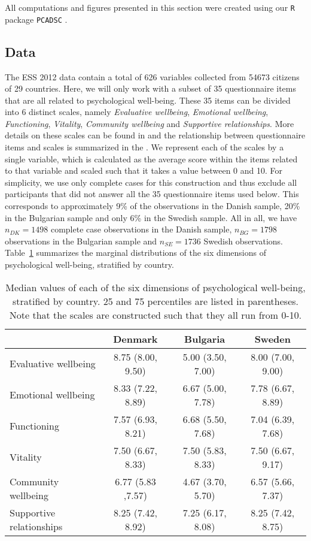 \documentclass[a4paper,14pt]{article}
\newcommand{\R}[1]{\texttt{#1}}
\begin{document}
All computations and figures presented in this section were created using our \R{R} package \R{PCADSC} \cite{PCADSC}.


\subsection*{Data}


The ESS 2012 data contain a total of 626 variables collected from 54673 citizens of 29 countries. Here, we will only work with a subset of 35 questionnaire items that are all related to psychological well-being. These 35 items can be divided into 6 distinct scales, namely \textit{Evaluative wellbeing}, \textit{Emotional wellbeing}, \textit{Functioning}, \textit{Vitality}, \textit{Community wellbeing} and \textit{Supportive relationships}. More details on these scales can be found in \cite{ESStopline5} and the relationship between questionnaire items and scales is summarized in the . We represent each of the scales by a single variable, which is calculated as the average score within the items related to that variable and scaled such that it takes a value between 0 and 10. For simplicity, we use only complete cases for this construction and thus exclude all participants that did not answer all the 35 questionnaire items used below. This corresponds to approximately 9\% of the observations in the Danish sample, 20\% in the Bulgarian sample and only 6\% in the Swedish sample. All in all, we have $n_{DK} = 1498$ complete case observations in the Danish sample, $n_{BG} = 1798$ observations in the Bulgarian sample and $n_{SE} = 1736$ Swedish observations. Table~\ref{tableDistr} summarizes the marginal distributions of the six dimensions of psychological well-being, stratified by country.

\begin{table}[!ht]
\centering
\begin{tabular}{lccc}
  \hline
  & Denmark & Bulgaria & Sweden \\
  \hline
 Evaluative wellbeing & 8.75 (8.00, 9.50) & 5.00 (3.50, 7.00) & 8.00 (7.00, 9.00) \\
 Emotional wellbeing & 8.33 (7.22, 8.89) & 6.67 (5.00, 7.78) & 7.78 (6.67, 8.89) \\
Functioning & 7.57 (6.93, 8.21) & 6.68 (5.50, 7.68) & 7.04 (6.39, 7.68) \\
Vitality & 7.50 (6.67, 8.33) & 7.50 (5.83, 8.33) & 7.50 (6.67, 9.17) \\
 Community wellbeing & 6.77 (5.83 ,7.57) & 4.67 (3.70, 5.70) & 6.57 (5.66, 7.37) \\
Supportive relationships & 8.25 (7.42, 8.92) & 7.25 (6.17, 8.08) & 8.25 (7.42, 8.75) \\
   \hline
\end{tabular}
\caption{Median values of each of the six dimensions of psychological well-being, stratified by country. 25 and 75 percentiles are listed in parentheses. Note that the scales are constructed such that they all run from 0-10.}
\label{tableDistr}
\end{table}
\end{document}
